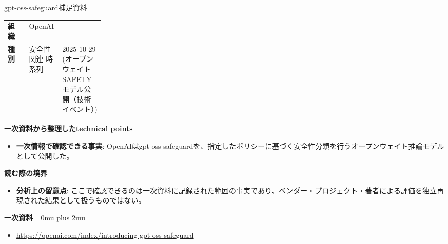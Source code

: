 \begin{technicalnote}{gpt-oss-safeguard}{補足資料}
\begingroup
\begin{tabularx}{\linewidth}{@{}>{\bfseries}p{0.22\linewidth}X@{}}
組織 & OpenAI \\
種別 & 安全性関連
時系列 & 2025-10-29 (オープンウェイト SAFETY モデル公開（技術イベント）) \\
\end{tabularx}
\smallskip
{\bfseries 一次資料から整理したtechnical points}
\begin{itemize}[leftmargin=1.5em,itemsep=0.35em]
\item \textbf{一次情報で確認できる事実}: OpenAIはgpt-oss-safeguardを、指定したポリシーに基づく安全性分類を行うオープンウェイト推論モデルとして公開した。
\end{itemize}
\begin{minipage}{\linewidth}
{\bfseries 読む際の境界}
\begin{itemize}[leftmargin=1.5em,itemsep=0.35em]
\item \textbf{分析上の留意点}: ここで確認できるのは一次資料に記録された範囲の事実であり、ベンダー・プロジェクト・著者による評価を独立再現された結果として扱うものではない。
\end{itemize}
\begin{samepage}
{\bfseries 一次資料}
\begingroup\sloppy
\Urlmuskip=0mu plus 2mu\relax
\begin{itemize}[leftmargin=1.5em,itemsep=0.25em]
\item {\scriptsize\url{https://openai.com/index/introducing-gpt-oss-safeguard}}
\end{itemize}
\endgroup
\end{samepage}
\end{minipage}
\endgroup
\end{technicalnote}
\medskip

